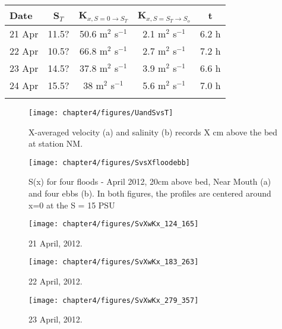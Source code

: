 \begin{center}
\begin{tabular}{| l || c | c | c | c |}
\hline
Date & S$_{T}$ & K$_{x,S=0 \rightarrow S_T}$ &  K$_{x,S=S_T \rightarrow S_o}$ & t\\
\hline \hline
21 Apr & 11.5? & 50.6 m$^2$ s$^{-1}$ & 2.1 m$^2$ s$^{-1}$ & 6.2 h\\ 

22 Apr & 10.5? & 66.8 m$^2$ s$^{-1}$ & 2.7 m$^2$ s$^{-1}$ & 7.2 h\\ 

23 Apr & 14.5? & 37.8 m$^2$ s$^{-1}$ & 3.9 m$^2$ s$^{-1}$ & 6.6 h\\ 

24 Apr & 15.5? & 38 m$^2$ s$^{-1}$ & 5.6 m$^2$ s$^{-1}$ & 7.0 h\\ 
\hline \label{tab:Kxtable}
\end{tabular}
\end{center}






\begin{figure}
	\texttt{[image: chapter4/figures/UandSvsT]} 
\caption{X-averaged velocity (a) and salinity (b) records X cm above the bed at station NM.} \label{fig:UandSvsTch4}
\end{figure}

\begin{figure}
	\texttt{[image: chapter4/figures/SvsXfloodebb]} 
\caption{S(x) for four floods - April 2012, 20cm above bed, Near Mouth (a) and four ebbs (b). In both figures, the profiles are centered around x=0 at the S = 15 PSU} \label{fig:SvsXall}
\end{figure}

\begin{figure}
	\texttt{[image: chapter4/figures/SvXwKx\_124\_165]} 
\caption{21 April, 2012. } \label{fig:Kx421}
\end{figure}

\begin{figure}
	\texttt{[image: chapter4/figures/SvXwKx\_183\_263]} 
\caption{22 April, 2012. } \label{fig:Kx422}
\end{figure}



\begin{figure}
	\texttt{[image: chapter4/figures/SvXwKx\_279\_357]} 
\caption{23 April, 2012. } \label{fig:Kx423}
\end{figure}



